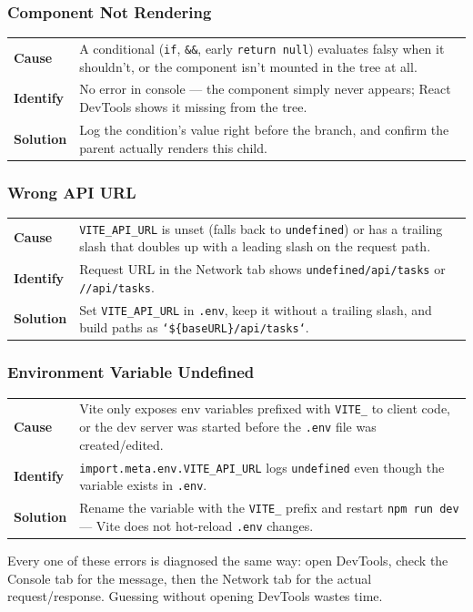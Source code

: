 \subsubsection*{Component Not Rendering}
\noindent\begin{tabularx}{\textwidth}{@{}>{\bfseries}p{2.3cm}X@{}}
\toprule
Cause & A conditional (\texttt{if}, \texttt{\&\&}, early \texttt{return
null}) evaluates falsy when it shouldn't, or the component isn't mounted
in the tree at all. \\
Identify & No error in console --- the component simply never appears;
React DevTools shows it missing from the tree. \\
Solution & Log the condition's value right before the branch, and confirm
the parent actually renders this child. \\
\bottomrule
\end{tabularx}

\subsubsection*{Wrong API URL}
\noindent\begin{tabularx}{\textwidth}{@{}>{\bfseries}p{2.3cm}X@{}}
\toprule
Cause & \texttt{VITE\_API\_URL} is unset (falls back to \texttt{undefined})
or has a trailing slash that doubles up with a leading slash on the
request path. \\
Identify & Request URL in the Network tab shows
\texttt{undefined/api/tasks} or \texttt{//api/tasks}. \\
Solution & Set \texttt{VITE\_API\_URL} in \texttt{.env}, keep it without a
trailing slash, and build paths as \texttt{`\$\{baseURL\}/api/tasks`}. \\
\bottomrule
\end{tabularx}

\subsubsection*{Environment Variable Undefined}
\noindent\begin{tabularx}{\textwidth}{@{}>{\bfseries}p{2.3cm}X@{}}
\toprule
Cause & Vite only exposes env variables prefixed with \texttt{VITE\_} to
client code, or the dev server was started before the \texttt{.env} file
was created/edited. \\
Identify & \texttt{import.meta.env.VITE\_API\_URL} logs \texttt{undefined}
even though the variable exists in \texttt{.env}. \\
Solution & Rename the variable with the \texttt{VITE\_} prefix and restart
\texttt{npm run dev} --- Vite does not hot-reload \texttt{.env} changes. \\
\bottomrule
\end{tabularx}

\begin{tipbox}[TIP]
Every one of these errors is diagnosed the same way: open DevTools,
check the Console tab for the message, then the Network tab for the
actual request/response. Guessing without opening DevTools wastes time.
\end{tipbox}
